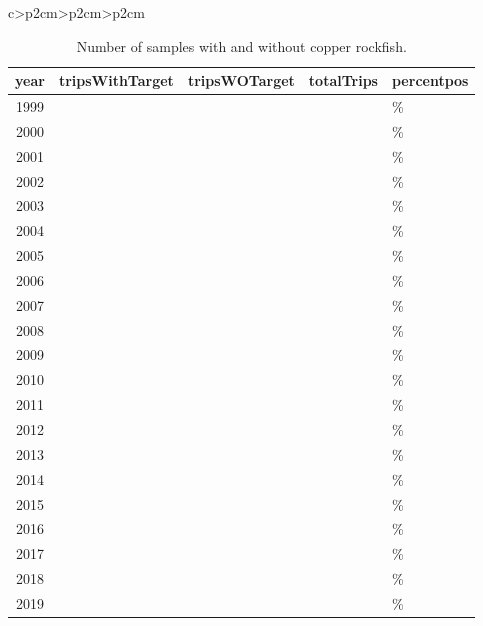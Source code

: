 \documentclass[11pt,
  letterpaper,
]{article}
\begin{document}
\begin{longtable}[t]{c>{\centering\arraybackslash}p{2cm}>{\centering\arraybackslash}p{2cm}>{\centering\arraybackslash}p{2cm}}
\begin{table}[H]
\centering\centering\centering
\caption{\label{tab:onboard-percentpos}Number of samples with and without copper rockfish.}
\centering
\fontsize{10}{12}\selectfont
\fontsize{10}{12}\selectfont
\begin{tabular}[t]{c>{\centering\arraybackslash}p{1.6cm}>{\centering\arraybackslash}p{1.6cm}>{\centering\arraybackslash}p{1.6cm}>{\centering\arraybackslash}p{1.6cm}}
\toprule
year & tripsWithTarget & tripsWOTarget & totalTrips & percentpos\\
\midrule
1999 & 14 & 167 & 181 & 7.70\%\\
2000 & 13 & 90 & 103 & 12.60\%\\
2001 & 31 & 168 & 199 & 15.60\%\\
2002 & 19 & 159 & 178 & 10.70\%\\
2003 & 57 & 515 & 572 & 10.00\%\\
2004 & 88 & 831 & 919 & 9.60\%\\
2005 & 150 & 559 & 709 & 21.20\%\\
2006 & 172 & 635 & 807 & 21.30\%\\
2007 & 203 & 669 & 872 & 23.30\%\\
2008 & 95 & 694 & 789 & 12.00\%\\
2009 & 100 & 752 & 852 & 11.70\%\\
2010 & 170 & 857 & 1027 & 16.60\%\\
2011 & 158 & 996 & 1154 & 13.70\%\\
2012 & 163 & 864 & 1027 & 15.90\%\\
2013 & 199 & 960 & 1159 & 17.20\%\\
2014 & 186 & 858 & 1044 & 17.80\%\\
2015 & 198 & 767 & 965 & 20.50\%\\
2016 & 221 & 1017 & 1238 & 17.90\%\\
2017 & 240 & 650 & 890 & 27.00\%\\
2018 & 170 & 547 & 717 & 23.70\%\\
2019 & 178 & 621 & 799 & 22.30\%\\
\bottomrule
\end{tabular}
\end{table}


\end{longtable}
\end{document}
